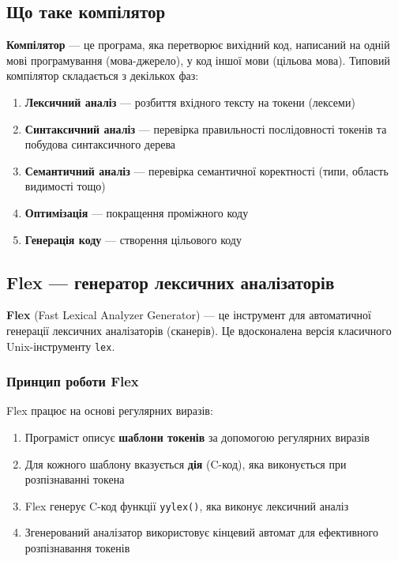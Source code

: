 \documentclass[12pt,a4paper]{article}
\begin{document}
\subsection{Що таке компілятор}

\textbf{Компілятор} --- це програма, яка перетворює вихідний код, написаний на одній мові програмування (мова-джерело), у код іншої мови (цільова мова). Типовий компілятор складається з декількох фаз:

\begin{enumerate}
    \item \textbf{Лексичний аналіз} --- розбиття вхідного тексту на токени (лексеми)
    \item \textbf{Синтаксичний аналіз} --- перевірка правильності послідовності токенів та побудова синтаксичного дерева
    \item \textbf{Семантичний аналіз} --- перевірка семантичної коректності (типи, область видимості тощо)
    \item \textbf{Оптимізація} --- покращення проміжного коду
    \item \textbf{Генерація коду} --- створення цільового коду
\end{enumerate}

\subsection{Flex --- генератор лексичних аналізаторів}

\textbf{Flex} (Fast Lexical Analyzer Generator) --- це інструмент для автоматичної генерації лексичних аналізаторів (сканерів). Це вдосконалена версія класичного Unix-інструменту \texttt{lex}.

\subsubsection{Принцип роботи Flex}

Flex працює на основі регулярних виразів:

\begin{enumerate}
    \item Програміст описує \textbf{шаблони токенів} за допомогою регулярних виразів
    \item Для кожного шаблону вказується \textbf{дія} (C-код), яка виконується при розпізнаванні токена
    \item Flex генерує C-код функції \texttt{yylex()}, яка виконує лексичний аналіз
    \item Згенерований аналізатор використовує кінцевий автомат для ефективного розпізнавання токенів
\end{enumerate}
\end{document}
